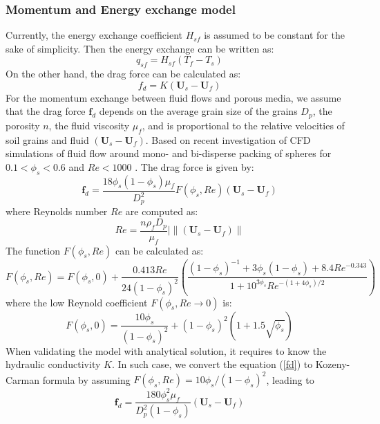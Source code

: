 \documentclass[preprint,12pt]{elsarticle}
\begin{document}
\subsubsection{Momentum and Energy exchange model}
Currently, the energy exchange coefficient $H_{sf}$ is assumed to be constant for the sake of simplicity. Then the energy exchange can be written as:
%
%
\begin{equation}
     q_{sf} = H_{sf} (T_f -T_s)
\end {equation}
%
%
On the other hand, the drag force can be calculated as:
%
%
\begin{equation}
    f_{d} = K (\pmb{U}_s - \pmb{U}_f)  
\end {equation}
%
%
For the momentum exchange between fluid flows and porous media, we assume that the drag force $\pmb{f}_{d}$ depends on the average grain size of the grains $D_p$, the porosity $n$, the fluid viscosity $\mu_f$, and is proportional to the relative velocities of soil grains and fluid $(\pmb{U}_s - \pmb{U}_f)$. Based on recent investigation of CFD simulations of fluid flow around mono- and bi-disperse packing of spheres for $0.1 < \phi_s < 0.6$ and $Re < 1000$ \cite{Drag}. The drag force is given by: \\
%
%
\begin{equation}
     \pmb{f}_{d} = \frac{18\phi_s(1-\phi_s)\mu_f}{D_p^2} F(\phi_s, Re) (\pmb{U}_s - \pmb{U}_f)  
\label{fd}
\end {equation}
%
%
where Reynolds number $Re$ are computed as:
%
%
\begin{equation}
     Re = \frac{n \rho_f D_p}{\mu_f} |\big\|(\pmb{U}_s - \pmb{U}_f)\big\|
\end {equation}
%
%
The function $F(\phi_s, Re)$ can be calculated as:
%
%
\begin{equation}
     F(\phi_s, Re)  = F(\phi_s, 0)  + \frac{0.413Re}{24 (1-\phi_s)^2} (\frac{(1-\phi_s)^{-1}+3\phi_s(1-\phi_s)+8.4Re^{-0.343}}{1+10^{3\phi_s}Re^{-(1+4\phi_s)/2}})
\end {equation}
%
%
where the low Reynold coefficient $ F(\phi_s, Re\rightarrow0)$ is:
%
%
\begin{equation}
     F(\phi_s, 0)  = \frac{10\phi_s}{ (1-\phi_s)^2}+(1-\phi_s)^2(1+1.5\sqrt{\phi_s})
\end {equation}
%
%
When validating the model with analytical solution, it requires to know the hydraulic conductivity $K$. In such case, we convert the equation (\ref{fd}) to Kozeny-Carman formula by assuming $F(\phi_s, Re) = 10\phi_s/(1-\phi_s)^2$, leading to 
%
%
\begin{equation}
     \pmb{f}_{d} = \frac{180 \phi_s^2\mu_f}{D_p^2 (1-\phi_s)} (\pmb{U}_s - \pmb{U}_f)  
\end {equation}
\end{document}
